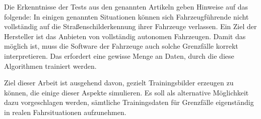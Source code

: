Die Erkenntnisse der Tests aus den genannten Artikeln geben Hinweise auf das folgende: In einigen genannten Situationen können sich Fahrzeugführende nicht vollständig auf die Straßenschilderkennung ihrer Fahrzeuge verlassen. Ein Ziel der Hersteller ist das Anbieten von vollständig autonomen Fahrzeugen. Damit das möglich ist, muss die Software der Fahrzeuge auch solche Grenzfälle korrekt interpretieren. Das erfordert eine gewisse Menge an Daten, durch die diese Algorithmen trainiert werden.

Ziel dieser Arbeit ist ausgehend davon, gezielt Trainingsbilder erzeugen zu können, die einige dieser Aspekte simulieren. Es soll als alternative Möglichkeit dazu vorgeschlagen werden, sämtliche Trainingsdaten für Grenzfälle eigenständig in realen Fahrsituationen aufzunehmen.

